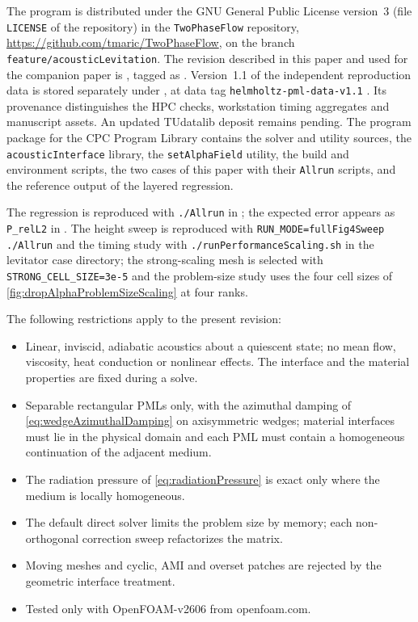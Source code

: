 \documentclass[final,12pt,nopreprintline]{elsarticle}
\newcommand{\code}[1]{\texttt{#1}}
\newcommand{\longhash}[1]{{\def\UrlBreaks{\do\a\do\b\do\c\do\d\do\e\do\f\do\0\do\1\do\2\do\3\do\4\do\5\do\6\do\7\do\8\do\9}\path{#1}}}
\begin{document}
The program is distributed under the GNU General Public License version~3
(file \code{LICENSE} of the repository) in the \code{TwoPhaseFlow}
repository, \url{https://github.com/tmaric/TwoPhaseFlow}, on the branch
\code{feature/acousticLevitation}.  The revision described in this paper and
used for the companion paper is
\longhash{7f00fc55a67aefbcfa88bdb46a4fc378bac0db0c}
\cite{XuLiuMaric2026AcousticSoftware}, tagged as
.  Version~1.1 of the independent
reproduction data is stored separately under
, at data tag
\code{helmholtz-pml-data-v1.1} \cite{XuMaric2026HelmholtzPMLData}.
Its provenance distinguishes the HPC checks, workstation timing aggregates
and manuscript assets.  An updated TUdatalib deposit remains pending.
The program package for the CPC Program
Library contains the solver and utility sources, the \code{acousticInterface}
library, the \code{setAlphaField} utility, the build and environment scripts,
the two cases of this paper with their \code{Allrun} scripts, and the
reference output of the layered regression.

The regression is reproduced with \code{./Allrun} in
; the
expected error appears as \code{P\_relL2} in
.  The height sweep
is reproduced with \code{RUN\_MODE=fullFig4Sweep ./Allrun} and the timing
study with \code{./runPerformanceScaling.sh} in the levitator case directory;
the strong-scaling mesh is selected with \code{STRONG\_CELL\_SIZE=3e-5} and
the problem-size study uses the four cell sizes of
\cref{fig:dropAlphaProblemSizeScaling} at four ranks.

The following restrictions apply to the present revision:
\begin{itemize}[leftmargin=*]
    \item Linear, inviscid, adiabatic acoustics about a quiescent state; no
    mean flow, viscosity, heat conduction or nonlinear effects.  The
    interface and the material properties are fixed during a solve.
    \item Separable rectangular PMLs only, with the azimuthal damping of
    \cref{eq:wedgeAzimuthalDamping} on axisymmetric wedges; material interfaces must
    lie in the physical domain and each PML must contain a homogeneous
    continuation of the adjacent medium.
    \item The radiation pressure of \cref{eq:radiationPressure} is exact only
    where the medium is locally homogeneous.
    \item The default direct solver limits the problem size by memory; each
    non-orthogonal correction sweep refactorizes the matrix.
    \item Moving meshes and cyclic, AMI and overset patches are rejected by
    the geometric interface treatment.
    \item Tested only with OpenFOAM-v2606 from openfoam.com.
\end{itemize}
\end{document}
